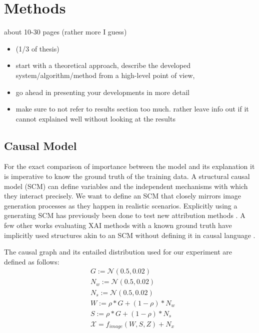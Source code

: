 \chapter{Methods}\label{chapter:method}

{ \color{red}

    about 10-30 pages (rather more I guess)

    \begin{itemize}
        \item (1/3 of thesis)
        \item start with a theoretical approach, describe the developed system/algorithm/method from a high-level point of view,
        \item go ahead in presenting your developments in more detail
        \item make sure to not refer to results section too much. rather leave info out if it cannot explained well without looking at the results
    \end{itemize}
}


\section{Causal Model}
For the exact comparison of importance between the model and its explanation it is imperative to know the ground truth of the training data. A structural causal model (SCM) can define variables and the independent mechanisms with which they interact precisely. We want to define an SCM that closely mirrors image generation processes as they happen in realistic scenarios. 
Explicitly using a generating SCM has previously been done to test new attribution methods \cite{Parafita2019, Wilming2023, Goyal2019, Reimers2019, Reimers2020}. A few other works evaluating XAI methods with a known ground truth have implicitly used structures akin to an SCM without defining it in causal language \cite{Kim2018, Yang2019}. 

The causal graph and its entailed distribution used for our experiment are defined as follows: 
\begin{align*}
    & G := \mathcal{N}(0.5,0.02) \\
    & N_w := \mathcal{N}(0.5,0.02) \\
    & N_s := \mathcal{N}(0.5,0.02) \\
    & W := \rho * G + (1-\rho)* N_w \\
    & S := \rho * G + (1-\rho)* N_s \\
    & \mathcal{X} = f_{image}(W, S, Z) + N_{x} \\
\end{align*}

